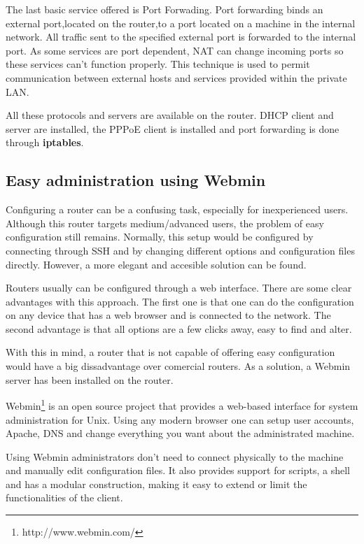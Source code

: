 The last basic service offered is Port Forwading. Port forwarding
binds an external port,located on the router,to a port located on a machine
in the internal network. All traffic sent to the specified
external port is forwarded to the internal port. As some services
are port dependent, NAT can change incoming ports so these services
can't function properly. This technique is used to permit communication between 
external hosts and services provided within the private LAN.

All these protocols and servers are available on the router. DHCP client
and server are installed, the PPPoE client is installed and port forwarding
is done through \textbf{iptables}.

\subsection{Easy administration using Webmin}
\label{sub-sec:webmin}
Configuring a router can be a confusing task, especially for inexperienced
users. Although this router targets medium/advanced users, the problem
of easy configuration still remains. Normally, this setup would be configured
by connecting through SSH and by changing different options and configuration
files directly. However, a more elegant and accesible solution can be found.

Routers usually can be configured through a web interface. There are some
clear advantages with this approach. The first one is that one can do the configuration
on any device that has a web browser and is connected to the network.
The second  advantage is that all options are a few clicks away, easy to find and
alter.

With this in mind, a router that is not capable of offering easy configuration
would have a big dissadvantage over comercial routers. As a solution,
a Webmin server has been installed on the router.

Webmin\footnote{http://www.webmin.com/} is an open source project that provides a web-based interface for
system administration for Unix. Using any modern browser one can setup
user accounts, Apache, DNS and change everything you want about the
administrated machine.

Using Webmin administrators don't need to connect physically to the machine
and manually edit configuration files. It also provides support for scripts,
a shell and has a modular construction, making it easy to extend or limit
the functionalities of the client.

